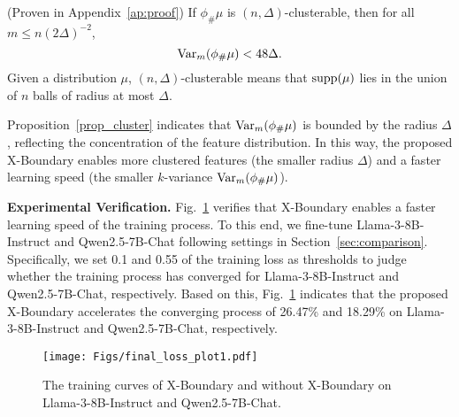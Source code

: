 \begin{proposition} (Proven in Appendix~\ref{ap:proof})
\label{prop_cluster}
 If $\phi_\# \mu$ is $(n, \Delta)$-clusterable, then for all $m \leq n(2\Delta)^{-2}$,
 \begin{equation}
     \mathrm{Var}_{m}(\phi_\# \mu) < 48\Delta.
 \end{equation}
 Given a distribution $\mu$, $(n, \Delta)$-clusterable means that $\textnormal{supp}(\mu)$ lies in the union of $n$ balls of radius at most $\Delta$.
\end{proposition}

 Proposition~\ref{prop_cluster} indicates that $\mathrm{Var}_{m}(\phi_\# \mu)$ is bounded by the radius $\Delta$, reflecting the concentration of the feature distribution. In this way, the proposed X-Boundary enables more clustered features (the smaller radius $\Delta$) and a faster learning speed (the smaller $k$-variance $\mathrm{Var}_{m}(\phi_\# \mu)$). 

\textbf{Experimental Verification.} Fig.~\ref{fig:loss_plot} verifies that X-Boundary enables a faster learning speed of the training process. To this end, we fine-tune Llama-3-8B-Instruct and Qwen2.5-7B-Chat following settings in Section~\ref{sec:comparison}. Specifically, we set 0.1 and 0.55 of the training loss as thresholds to judge whether the training process has converged for Llama-3-8B-Instruct and Qwen2.5-7B-Chat, respectively. Based on this, Fig.~\ref{fig:loss_plot} indicates that the proposed X-Boundary accelerates the converging process of 26.47\% and 18.29\% on Llama-3-8B-Instruct and Qwen2.5-7B-Chat, respectively.
%
\begin{figure}[t]
\begin{center}
\centerline{\texttt{[image: Figs/final\_loss\_plot1.pdf]}}
\vskip -0.1in
\caption{The training curves of X-Boundary and without X-Boundary on Llama-3-8B-Instruct and Qwen2.5-7B-Chat.}
\label{fig:loss_plot}
\end{center}
\vskip -0.4in
\end{figure}